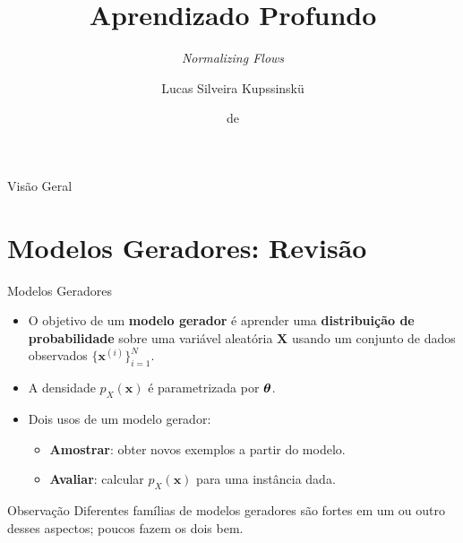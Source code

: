 \documentclass[aspectratio=169,xcolor=dvipsnames]{beamer}
\title{Aprendizado Profundo}
\subtitle{\textit{Normalizing Flows}}
\author{Lucas Silveira Kupssinskü}
\institute
{
    Machine Learning Theory and Applications Laboratory \\
    PUCRS
}
\date{\mespor de \the\year}
\begin{document}
  \begin{frame}
    \titlepage
  \end{frame}

  \begin{frame}{Visão Geral}
    \tableofcontents
  \end{frame}

  \section{Modelos Geradores: Revisão}

  \begin{frame}{Modelos Geradores}
    \begin{itemize}
      \item O objetivo de um \textbf{modelo gerador} é aprender uma
      \textcolor{FlowRed}{\textbf{distribuição de probabilidade}} sobre
      uma variável aleatória $\mathbf{X}$ usando um conjunto de dados
      observados $\{\mathbf{x}^{(i)}\}_{i=1}^{N}$.
      \item A densidade $p_{X}(\mathbf{x})$ é parametrizada por $\bm{\theta}$.
      \item Dois usos de um modelo gerador:
      \begin{itemize}
        \item \textcolor{AccentBlue}{\textbf{Amostrar}}: obter novos
        exemplos a partir do modelo.
        \item \textcolor{AccentBlue}{\textbf{Avaliar}}: calcular
        $p_{X}(\mathbf{x})$ para uma instância dada.
      \end{itemize}
    \end{itemize}
    \begin{block}{Observação}
      Diferentes famílias de modelos geradores são fortes em um ou outro
      desses aspectos; poucos fazem os dois bem.
    \end{block}
  \end{frame}
\end{document}
